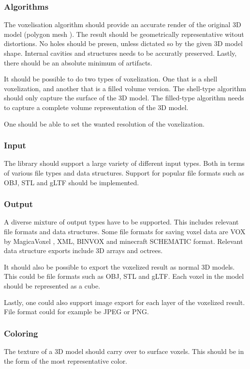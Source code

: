 \subsubsection{Algorithms}
The voxelisation algorithm should provide an accurate render of the original 3D model (polygon mesh \cite{polygon-mesh}). The result should be geometrically representative witout distortions. No holes should be presen, unless dictated so by the given 3D model shape. Internal cavities and structures needs to be accuratly preserved. Lastly, there should be an absolute minimum of artifacts.

It should be possible to do two types of voxelization. One that is a shell voxelization, and another that is a filled volume version. The shell-type algorithm should only capture the surface of the 3D model. The filled-type algorithm needs to capture a complete volume representation of the 3D model.

One should be able to set the wanted resolution of the voxelization.

\subsubsection{Input}
The library should support a large variety of different input types. Both in terms of various file types and data structures. Support for popular file formats such as OBJ, STL and gLTF should be implemented.

\subsubsection{Output}
A diverse mixture of output types have to be supported. This includes relevant file formats and data structures. Some file formats for saving voxel data are VOX by MagicaVoxel \cite{magica-voxel}, XML, BINVOX \cite{binvox-file-format} and minecraft SCHEMATIC format. Relevant data structure exports include 3D arrays and octrees.

It should also be possible to export the voxelized result as normal 3D models. This could be file formats such as OBJ, STL and gLTF. Each voxel in the model should be represented as a cube.

Lastly, one could also support image export for each layer of the voxelized result. File format could for example be JPEG or PNG.

\subsubsection{Coloring}
The texture of a 3D model should carry over to surface voxels. This should be in the form of the most representative color.

